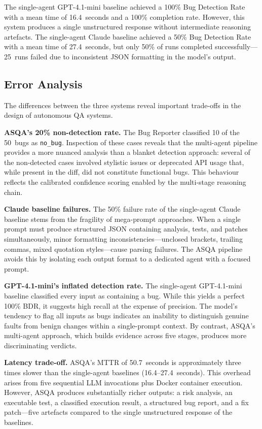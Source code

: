 \documentclass[conference]{IEEEtran}
\begin{document}
The single-agent GPT-4.1-mini baseline achieved a 100\% Bug Detection Rate with a mean time of 16.4~seconds and a 100\% completion rate. However, this system produces a single unstructured response without intermediate reasoning artefacts. The single-agent Claude baseline achieved a 50\% Bug Detection Rate with a mean time of 27.4~seconds, but only 50\% of runs completed successfully---25~runs failed due to inconsistent JSON formatting in the model's output.

\subsection{Error Analysis}

The differences between the three systems reveal important trade-offs in the design of autonomous QA systems.

\textbf{ASQA's 20\% non-detection rate.} The Bug Reporter classified 10 of the 50~bugs as \texttt{no\_bug}. Inspection of these cases reveals that the multi-agent pipeline provides a more nuanced analysis than a blanket detection approach: several of the non-detected cases involved stylistic issues or deprecated API usage that, while present in the diff, did not constitute functional bugs. This behaviour reflects the calibrated confidence scoring enabled by the multi-stage reasoning chain.

\textbf{Claude baseline failures.} The 50\% failure rate of the single-agent Claude baseline stems from the fragility of mega-prompt approaches. When a single prompt must produce structured JSON containing analysis, tests, and patches simultaneously, minor formatting inconsistencies---unclosed brackets, trailing commas, mixed quotation styles---cause parsing failures. The ASQA pipeline avoids this by isolating each output format to a dedicated agent with a focused prompt.

\textbf{GPT-4.1-mini's inflated detection rate.} The single-agent GPT-4.1-mini baseline classified every input as containing a bug. While this yields a perfect 100\% BDR, it suggests high recall at the expense of precision. The model's tendency to flag all inputs as bugs indicates an inability to distinguish genuine faults from benign changes within a single-prompt context. By contrast, ASQA's multi-agent approach, which builds evidence across five stages, produces more discriminating verdicts.

\textbf{Latency trade-off.} ASQA's MTTR of 50.7~seconds is approximately three times slower than the single-agent baselines (16.4--27.4~seconds). This overhead arises from five sequential LLM invocations plus Docker container execution. However, ASQA produces substantially richer outputs: a risk analysis, an executable test, a classified execution result, a structured bug report, and a fix patch---five artefacts compared to the single unstructured response of the baselines.
\end{document}
